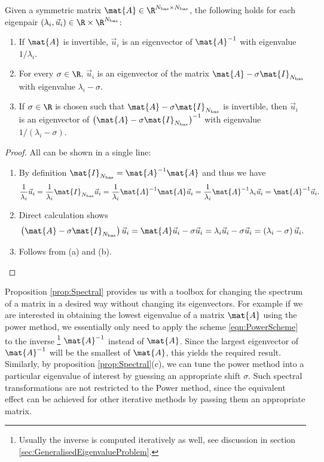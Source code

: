 \begin{prop}
	\label{prop:Spectral}
	Given a symmetric matrix $\mat{A} \in \R^{\Nbas \times \Nbas}$,
	the following holds for each eigenpair
	$(\lambda_i, \vec{u}_i) \in \R \times \R^{\Nbas}$:
	\begin{enumerate}[label=(\alph*)]
		\item If $\mat{A}$ is invertible,
			$\vec{u}_i$ is an eigenvector of $\mat{A}^{-1}$ with eigenvalue
			$1 / \lambda_i$.
		\item For every $\sigma \in \R$, $\vec{u}_i$ is an eigenvector
			of the matrix $\mat{A} - \sigma \mat{I}_{\Nbas}$
			with eigenvalue $\lambda_i - \sigma$.
		\item If $\sigma \in \R$ is chosen such that
			$\mat{A} - \sigma \mat{I}_{\Nbas}$
			is invertible, then  $\vec{u}_i$ is an eigenvector
			of $\left( \mat{A} - \sigma \mat{I}_{\Nbas} \right)^{-1}$
			with eigenvalue $1 / (\lambda_i - \sigma)$.
	\end{enumerate}
	\begin{proof}
		All can be shown in a single line:
		\begin{enumerate}[label=(\alph*)]
			\item By definition $\mat{I}_{\Nbas} = \mat{A}^{-1} \mat{A}$
				and thus we have
				\[ \frac{1}{\lambda_i} \vec{u}_i
					= \frac{1}{\lambda_i} \mat{I}_{\Nbas} \vec{u}_i
					= \frac{1}{\lambda_i} \mat{A}^{-1} \mat{A} \vec{u}_i
					= \frac{1}{\lambda_i} \mat{A}^{-1} \lambda_i \vec{u}_i
					= \mat{A}^{-1} \vec{u}_i.
				\]
			\item Direct calculation shows
				\[ \left( \mat{A} - \sigma \mat{I}_{\Nbas} \right) \vec{u}_i
					= \mat{A} \vec{u}_i - \sigma \vec{u}_i
					= \lambda_i \vec{u}_i - \sigma \vec{u}_i
					= \left( \lambda_i - \sigma  \right) \vec{u}_i.
				\]
			\item Follows from (a) and (b).
		\end{enumerate}
	\end{proof}
\end{prop}

Proposition \ref{prop:Spectral} provides us with a toolbox for
changing the spectrum of a matrix in a desired way without changing its eigenvectors.
For example if we are interested in obtaining
the lowest eigenvalue of a matrix $\mat{A}$ using the power method,
we essentially only need to apply the scheme \eqref{eqn:PowerScheme}
to the inverse%
\footnote{Usually the inverse is computed iteratively as well, see discussion
	in section \ref{sec:GeneralisedEigenvalueProblem}.}
$\mat{A}^{-1}$ instead of $\mat{A}$.
Since the largest eigenvector of $\mat{A}^{-1}$ will be the smallest of $\mat{A}$,
this yields the required result.
Similarly, by proposition \ref{prop:Spectral}(c),
we can tune the power method into a particular eigenvalue of interest
by guessing an appropriate shift $\sigma$.
Such spectral transformations are not restricted to the Power method,
since the equivalent effect can be achieved for other iterative
methods by passing them an appropriate matrix.

